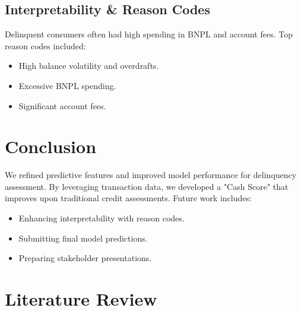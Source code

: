 \documentclass[12pt,letterpaper]{article}
\begin{document}
\subsection{Interpretability \& Reason Codes}
Delinquent consumers often had high spending in BNPL and account fees. Top reason codes included:
\begin{itemize}
    \item High balance volatility and overdrafts.
    \item Excessive BNPL spending.
    \item Significant account fees.
\end{itemize}

\section{Conclusion}
We refined predictive features and improved model performance for delinquency assessment. By leveraging transaction data, we developed a "Cash Score" that improves upon traditional credit assessments. Future work includes:
\begin{itemize}
    \item Enhancing interpretability with reason codes.
    \item Submitting final model predictions.
    \item Preparing stakeholder presentations.
\end{itemize}


\section{Literature Review}



\clearpage

\makereference



\cite{plawiak2020dghnl}
\cite{radford2019gpt2}
\cite{vaswani2023attention}
\end{document}
